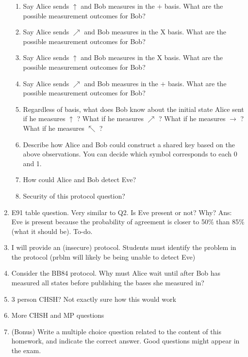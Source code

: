 \documentclass[12pt]{article}
\begin{document}
\begin{enumerate}[font=\bfseries]
        \begin{enumerate}
            \item Say Alice sends $\uparrow$ and Bob measures in the $+$ basis. What are the possible measurement outcomes for Bob?
            \item Say Alice sends $\nearrow$ and Bob measures in the X basis. What are the possible measurement outcomes for Bob?
            \item Say Alice sends $\uparrow$ and Bob measures in the X basis. What are the possible measurement outcomes for Bob?
            \item Say Alice sends $\nearrow$ and Bob measures in the $+$ basis. What are the possible measurement outcomes for Bob?
            \item Regardless of basis, what does Bob know about the initial state Alice sent if he measures $\uparrow$ ? What if he measures $\nearrow$ ? What if he measures  $\rightarrow$ ? What if he measures $\nwarrow$ ?
            \item Describe how Alice and Bob could construct a shared key based on the above observations. You can decide which symbol corresponds to each 0 and 1. 
            \item How could Alice and Bob detect Eve?
            \item Security of this protocol question?
        \end{enumerate}
    \item E91 table question. Very similar to Q2. Is Eve present or not? Why? Ans: Eve is present because the probability of agreement is closer to 50\% than 85\% (what it should be). To-do.
    \item I will provide an (insecure) protocol. Students must identify the problem in the protocol (prblm will likely be being unable to detect Eve)
    \item Consider the BB84 protocol. Why must Alice wait until after Bob has measured all states before publishing the bases she measured in?
    \item 3 person CHSH? Not exactly sure how this would work
    \item More CHSH and MP questions
    \item (Bonus) Write a multiple choice question related to the content of this homework, and indicate the correct answer. Good questions might appear in the exam.
\end{enumerate}
\end{document}
